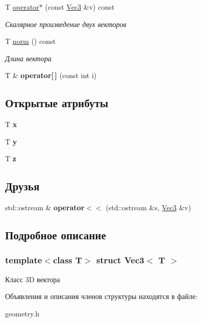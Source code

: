 \begin{DoxyCompactItemize}
T \hyperlink{structVec3_a95f0f9e61705b0985ebb9a428c2b89fc}{operator$\ast$} (const \hyperlink{structVec3}{Vec3} \&v) const
\begin{DoxyCompactList}\small\item\em Скалярное произведение двух векторов \end{DoxyCompactList}\item 
\mbox{\label{structVec3_af820381ed8bfdb2c82bf8d960b2596b4}} 
T \hyperlink{structVec3_af820381ed8bfdb2c82bf8d960b2596b4}{norm} () const
\begin{DoxyCompactList}\small\item\em Длина вектора \end{DoxyCompactList}\item 
\mbox{\label{structVec3_a5ac8f4b5ab9b52abfc101b45f39c5c8f}} 
T \& {\bfseries operator\mbox{[}$\,$\mbox{]}} (const int i)
\end{DoxyCompactItemize}
\subsection*{Открытые атрибуты}
\begin{DoxyCompactItemize}
\item 
\mbox{\label{structVec3_aeba95c52e15a5a7476550c1798210db2}} 
T {\bfseries x}
\item 
\mbox{\label{structVec3_a76f06eaf078504ac1d09c910ddb24696}} 
T {\bfseries y}
\item 
\mbox{\label{structVec3_a0f694311f956380952aee054cbabb8b6}} 
T {\bfseries z}
\end{DoxyCompactItemize}
\subsection*{Друзья}
\begin{DoxyCompactItemize}
\item 
\mbox{\label{structVec3_acf89f9161224752f03cb423da592035e}} 
std\+::ostream \& {\bfseries operator$<$$<$} (std\+::ostream \&s, \hyperlink{structVec3}{Vec3} \&v)
\end{DoxyCompactItemize}


\subsection{Подробное описание}
\subsubsection*{template$<$class T$>$\newline
struct Vec3$<$ T $>$}

Класс 3D вектора 

Объявления и описания членов структуры находятся в файле\+:\begin{DoxyCompactItemize}
\item 
geometry.\+h\end{DoxyCompactItemize}
